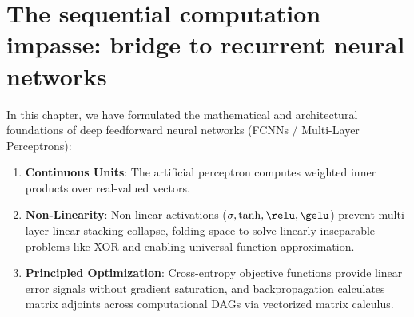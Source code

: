 \documentclass[../../main.tex]{subfiles}
\begin{document}
\section{The sequential computation impasse: bridge to recurrent neural networks}
\label{sec:bridge_to_ch03}

In this chapter, we have formulated the mathematical and architectural foundations of deep feedforward neural networks (FCNNs / Multi-Layer Perceptrons):
\begin{enumerate}
    \item \textbf{Continuous Units}: The artificial perceptron computes weighted inner products over real-valued vectors.
    \item \textbf{Non-Linearity}: Non-linear activations ($\sigma, \tanh, \relu, \gelu$) prevent multi-layer linear stacking collapse, folding space to solve linearly inseparable problems like XOR and enabling universal function approximation.
    \item \textbf{Principled Optimization}: Cross-entropy objective functions provide linear error signals without gradient saturation, and backpropagation calculates matrix adjoints across computational DAGs via vectorized matrix calculus.
\end{enumerate}
\end{document}
